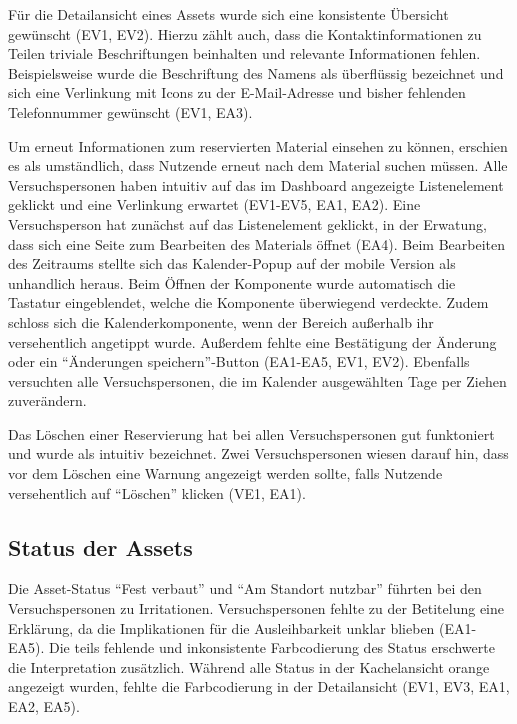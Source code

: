 Für die Detailansicht eines Assets wurde sich eine konsistente Übersicht gewünscht (EV1, EV2).
Hierzu zählt auch, dass die Kontaktinformationen zu Teilen triviale Beschriftungen beinhalten und
relevante Informationen fehlen. Beispielsweise wurde die Beschriftung des Namens als überflüssig
bezeichnet und sich eine Verlinkung mit Icons zu der E-Mail-Adresse und bisher fehlenden
Telefonnummer gewünscht (EV1, EA3).

Um erneut Informationen zum reservierten Material einsehen zu können, erschien es als umständlich,
dass Nutzende erneut nach dem Material suchen müssen. Alle Versuchspersonen haben intuitiv auf das
im Dashboard angezeigte Listenelement geklickt und eine Verlinkung erwartet (EV1-EV5, EA1, EA2).
Eine Versuchsperson hat zunächst auf das Listenelement geklickt, in der Erwatung, dass sich eine
Seite zum Bearbeiten des Materials öffnet (EA4). Beim Bearbeiten des Zeitraums stellte sich das
Kalender-Popup auf der mobile Version als unhandlich heraus. Beim Öffnen der Komponente wurde
automatisch die Tastatur eingeblendet, welche die Komponente überwiegend verdeckte. Zudem schloss
sich die Kalenderkomponente, wenn der Bereich außerhalb ihr versehentlich angetippt wurde. Außerdem
fehlte eine Bestätigung der Änderung oder ein \enquote{Änderungen speichern}-Button (EA1-EA5, EV1,
EV2). Ebenfalls versuchten alle Versuchspersonen, die im Kalender ausgewählten Tage per Ziehen
zuverändern.

Das Löschen einer Reservierung hat bei allen Versuchspersonen gut funktoniert
und wurde als intuitiv bezeichnet. Zwei Versuchspersonen wiesen darauf hin, dass vor dem
Löschen eine Warnung angezeigt werden sollte, falls Nutzende versehentlich auf \enquote{Löschen}
klicken (VE1, EA1).


\subsection{Status der Assets}
Die Asset-Status \enquote{Fest verbaut} und \enquote{Am Standort nutzbar} führten bei den
Versuchspersonen zu Irritationen. Versuchspersonen fehlte zu der Betitelung eine Erklärung, da die
Implikationen für die Ausleihbarkeit unklar blieben (EA1-EA5). Die teils fehlende und inkonsistente
Farbcodierung des Status erschwerte die Interpretation zusätzlich. Während alle Status in der
Kachelansicht orange angezeigt wurden, fehlte die Farbcodierung in der Detailansicht (EV1, EV3, EA1,
EA2, EA5).

